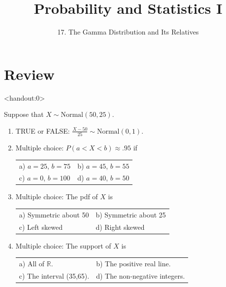 

\newcommand{\lecturenum}{17}

\title[SS2857]{Probability and Statistics I}
\subtitle{\lecturenum. The Gamma Distribution and Its Relatives}

\date{}







{

\begin{frame}
  \addtocounter{framenumber}{-1}

  \maketitle
\end{frame}
}

\section{Review}
\begin{frame}<handout:0>

  Suppose that $X \sim \mbox{Normal}(50, 25)$.

  \bigskip
  
  \begin{enumerate}
  \item TRUE or FALSE: $\frac{X-50}{25} \sim \mbox{Normal}(0,1)$.
  \item Multiple choice: $P(a < X < b) \approx .95$ if
    \begin{tabular}{ll}
      a) $a=25$, $b=75$ & b) $a=45$, $b=55$\\
      c) $a=0$, $b=100$ & d) $a=40$, $b=50$
    \end{tabular}
  \item Multiple choice: The pdf of $X$ is
    \begin{tabular}{ll}
      a) Symmetric about 50 &
                               b) Symmetric about 25\\
      c) Left skewed  &
                       d) Right skewed\\
    \end{tabular}
  \item Multiple choice: The support of $X$ is
    \begin{tabular}{ll}
      a) All of $\mathbb R$. &
                               b) The positive real line.\\
      c) The interval (35,65). &
                       d) The non-negative integers.
    \end{tabular}
    

  \end{enumerate}
  
  
\end{frame}

